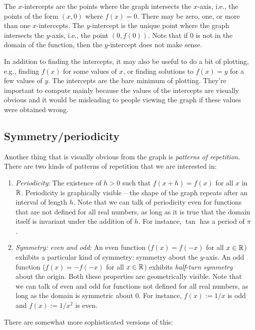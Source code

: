 \documentclass[10pt]{amsart}
\begin{document}
The $x$-intercepts are the points where the graph intersects the
$x$-axis, i.e., the points of the form $(x,0)$ where $f(x) = 0$. There
may be zero, one, or more than one $x$-intercepts. The $y$-intercept
is the unique point where the graph intersects the $y$-axis, i.e., the
point $(0,f(0))$. Note that if $0$ is not in the domain of the
function, then the $y$-intercept does not make sense.

In addition to finding the intercepts, it may also be useful to do a
bit of plotting, e.g., finding $f(x)$ for some values of $x$, or
finding solutions to $f(x) = y$ for a few values of $y$. The
intercepts are the bare minimum of plotting. They're important to
compute mainly because the values of the intercepts are visually
obvious and it would be misleading to people viewing the graph if
these values were obtained wrong.

\subsection{Symmetry/periodicity}

Another thing that is visually obvious from the graph is {\em patterns
of repetition}. There are two kinds of patterns of repetition that we
are interested in:

\begin{enumerate}
\item {\em Periodicity}: The existence of $h > 0$ such that $f(x + h)
  = f(x)$ for all $x$ in $\mathbb{R}$. Periodicity is graphically visible --
  the shape of the graph repeats after an interval of length $h$. Note
  that we can talk of periodicity even for functions that are not
  defined for all real numbers, as long as it is true that the domain
  itself is invariant under the addition of $h$. For instance, $\tan$
  has a period of $\pi$.
\item {\em Symmetry: even and odd}: An even function ($f(x) = f(-x)$
  for all $x \in \mathbb{R}$) exhibits a particular kind of symmetry: symmetry
  about the $y$-axis. An odd function ($f(x) = -f(-x)$ for all $x \in
  \mathbb{R}$) exhibits {\em half-turn symmetry} about the origin. Both these
  properties are geometrically visible. Note that we can talk of even
  and odd for functions not defined for all real numbers, as long as
  the domain is symmetric about $0$. For instance, $f(x) := 1/x$ is
  odd and $f(x) := 1/x^2$ is even.
\end{enumerate}

There are somewhat more sophisticated versions of this:
\end{document}
